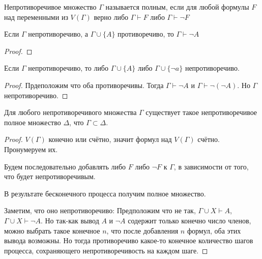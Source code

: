 \begin{definition} \thmslashn 

    Непротиворечивое множество $\Gamma$ называется полным, если для любой формулы $F$ над переменными из $V(\Gamma)$ верно либо $\Gamma \vdash F$ либо $\Gamma \vdash \neg F$
\end{definition}
\begin{lemma} \thmslashn

    Если $\Gamma$ непротиворечиво, а $\Gamma \cup \{A\}$ противоречиво, то $\Gamma \vdash \neg A$
    \begin{proof} \thmslashn
    
    \end{proof}
\end{lemma}
\begin{lemma} \thmslashn

    Если $\Gamma$ непротиворечиво, то либо $\Gamma \cup \{A\} $ либо $\Gamma \cup \{\neg a\} $ непротиворечиво.
    \begin{proof} \thmslashn
    
        Прдеположим что оба противоречивы. Тогда $\Gamma \vdash \neg A$ и $\Gamma \vdash \neg (\neg A)$. Но $\Gamma$ непротиворечиво.
    \end{proof}
\end{lemma}
\begin{lemma} \thmslashn

    Для любого непротиворечивого множества $\Gamma$ существует такое непротиворечивое полное множество $\Delta$, что $\Gamma \subset \Delta$.
    \begin{proof} \thmslashn
    
        $V(\Gamma)$ конечно или счётно, значит формул над $V(\Gamma)$ счётно. Пронумеруем их.

        Будем последовательно добавлять либо $F$ либо $\neg F$ к $\Gamma$, в зависимости от того, что будет непротиворечивым.

        В результате бесконечного процесса получим полное множество.

        Заметим, что оно непротиворечиво: Предположим что не так, $\Gamma \cup X \vdash A$, $\Gamma \cup X \vdash \neg A$. Но так-как вывод $A$ и $\neg A$ содержит только конечно число членов, можно выбрать такое конечное $n$, что после добавления  $n$ формул, оба этих вывода возможны. Но тогда противоречиво какое-то конечное количество шагов процесса, сохраняющего непротиворечивость на каждом шаге.
    \end{proof}
\end{lemma}
